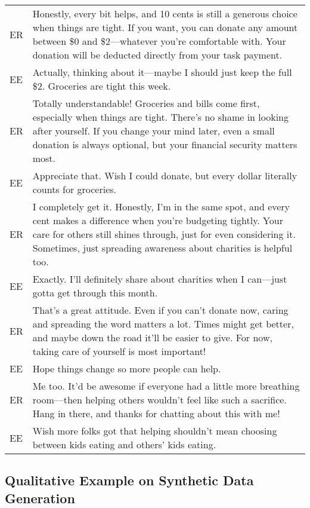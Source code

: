 \begin{table}[!htbp]
{\begin{tabular}{p{} p{}}
\centering ER & Honestly, every bit helps, and 10 cents is still a generous choice when things are tight. If you want, you can donate any amount between \$0 and \$2—whatever you're comfortable with. Your donation will be deducted directly from your task payment. \\
\rowcolor{gray!15} \centering EE & Actually, thinking about it—maybe I should just keep the full \$2. Groceries are tight this week.\\
\centering ER & Totally understandable! Groceries and bills come first, especially when things are tight. There's no shame in looking after yourself. If you change your mind later, even a small donation is always optional, but your financial security matters most.\\
\rowcolor{gray!15} \centering EE & Appreciate that. Wish I could donate, but every dollar literally counts for groceries. \\
\centering ER & I completely get it. Honestly, I'm in the same spot, and every cent makes a difference when you're budgeting tightly. Your care for others still shines through, just for even considering it. Sometimes, just spreading awareness about charities is helpful too. \\
\rowcolor{gray!15} \centering EE & Exactly. I'll definitely share about charities when I can—just gotta get through this month. \\
\centering ER & That's a great attitude. Even if you can't donate now, caring and spreading the word matters a lot. Times might get better, and maybe down the road it'll be easier to give. For now, taking care of yourself is most important! \\
\rowcolor{gray!15} \centering EE & Hope things change so more people can help. \\
\centering ER & Me too. It'd be awesome if everyone had a little more breathing room—then helping others wouldn't feel like such a sacrifice. Hang in there, and thanks for chatting about this with me!\\
\rowcolor{gray!15} \centering EE & Wish more folks got that helping shouldn't mean choosing between kids eating and others' kids eating.\\
\bottomrule
\end{tabular}
}
\end{table}


\clearpage
\subsection{Qualitative Example on Synthetic Data Generation}

